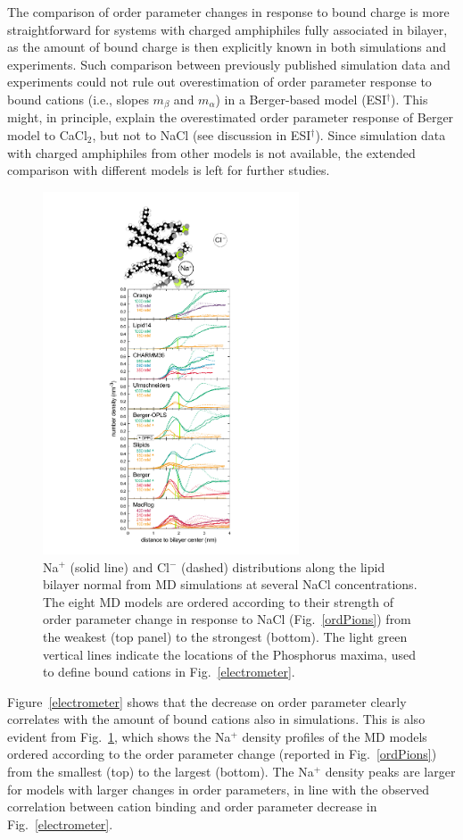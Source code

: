\documentclass[twoside,twocolumn,9pt]{article}
\begin{document}
The comparison of order parameter changes in response to bound charge is more straightforward for
systems with charged amphiphiles fully associated in bilayer, as the amount of bound charge
is then explicitly known in both simulations and experiments. Such comparison
between previously published simulation data \cite{miettinen09} and experiments \cite{scherer89,franzin98}
could not rule out
overestimation of order parameter response to bound cations (i.e., slopes $m_\beta$ and $m_\alpha$)
in a Berger-based model (ESI$^\dag$).
This might, in principle, explain the overestimated order parameter 
response of Berger model to CaCl$_2$, but not to NaCl (see discussion in ESI$^\dag$).
Since simulation data with charged amphiphiles from other models is not available,
the extended comparison with different models is left for further studies.

\begin{figure}[!h]
  \centering
  \includegraphics[width=7.595cm]{../Fig/NaDensities_withSnap.pdf}
  \caption{\label{NAdensities}
    Na$^+$ (solid line) and Cl$^-$ (dashed) distributions along the lipid bi\-layer normal from MD simulations
    at several NaCl concentrations.
    The eight MD models are ordered according to their strength of order parameter change in response to NaCl
    (Fig.~\ref{ordPions})
    from the weakest (top panel) to the strongest (bottom).
    The light green vertical lines indicate the locations of the Phosphorus maxima,
    used to define bound cations in Fig.~\ref{electrometer}.
}
\end{figure}
%
Figure~\ref{electrometer} shows that the decrease on order parameter clearly correlates with the
amount of bound cations also in simulations. This is also evident from Fig.~\ref{NAdensities},
which shows the Na$^+$ density profiles of the MD models ordered according to the order parameter change 
(reported in Fig.~\ref{ordPions}) from the smallest (top) to the largest (bottom).
The Na$^+$ density peaks are larger for models with larger changes in order parameters,
in line with the observed correlation between cation binding and order parameter decrease in
Fig.~\ref{electrometer}.
\end{document}
